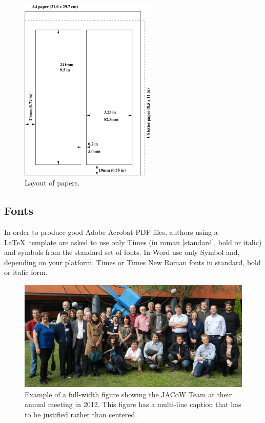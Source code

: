 \documentclass[acus,%
              ]{jacow}
\begin{document}
\begin{figure}[!htb]
   \centering
   \includegraphics*[width=65mm]{JACpic_mc}
   \caption{Layout of papers.}
   \label{l2ea4-f1}
\end{figure}

\subsection{Fonts}

In order to produce good Adobe Acrobat PDF files,
authors using a \LaTeX\ template are asked to use only Times (in roman [standard],
bold or italic) and symbols from  the standard set of fonts. In Word use only Symbol
and, depending on your platform, Times or Times New Roman fonts in standard, bold or
italic form.

\begin{figure}[!tbh]
    \centering
    \includegraphics*[width=\textwidth]{JACpic2v3}

    \caption{Example of a full-width figure showing the JACoW Team at their annual
             meeting in 2012. This figure has a multi-line caption that has to
             be justified rather than centered.}
    \label{l2ea4-f2}
\end{figure}
\end{document}
